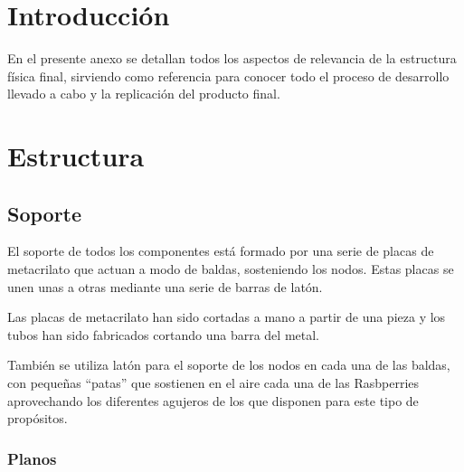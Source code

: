 \documentclass{article}
\title{\hmwkTitle}
\author{\textbf{\hmwkAuthorName}}
\date{\hmwkDueDate}
\begin{document}
\maketitle
\begin{abstract}
Marcologger es una herramienta que permite observar la salida de un programa distribuido desde una única interfaz, integrándose además en rsyslog, utilizando Snorky para la gestión de los WebSockets.
\end{abstract}


\setcounter{tocdepth}{1}

\tableofcontents
\newpage

\section{Introducción}

En el presente anexo se detallan todos los aspectos de relevancia de la estructura física final, sirviendo como referencia para conocer todo el proceso de desarrollo llevado a cabo y la replicación del producto final.

\section{Estructura}

\subsection{Soporte}

El soporte de todos los componentes está formado por una serie de placas de metacrilato que actuan a modo de baldas, sosteniendo los nodos. Estas placas se unen unas a otras mediante una serie de barras de latón.

Las placas de metacrilato han sido cortadas a mano a partir de una pieza y los tubos han sido fabricados cortando una barra del metal.

También se utiliza latón para el soporte de los nodos en cada una de las baldas, con pequeñas ``patas'' que sostienen en el aire cada una de las Rasbperries aprovechando los diferentes agujeros de los que disponen para este tipo de propósitos.


\subsubsection{Planos}
\end{document}
